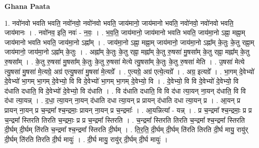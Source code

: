 \documentclass[17pt]{extarticle}
\begin{document}
\textbf{Ghana Paata } \newline

1. नवो॑नवो भवति भवति॒ नवो॑नवो॒ नवो॑नवो भवति॒ जाय॑मानो॒ जाय॑मानो भवति॒ नवो॑नवो॒ नवो॑नवो भवति॒ जाय॑मानः । . नवो॑नव॒ इति॒ नवः॑ - न॒वः॒ । . भ॒व॒ति॒ जाय॑मानो॒ जाय॑मानो भवति भवति॒ जाय॑मा॒नो ऽह्ना॒ मह्ना॒म् जाय॑मानो भवति भवति॒ जाय॑मा॒नो ऽह्ना᳚म् । . जाय॑मा॒नो ऽह्ना॒ मह्ना॒म् जाय॑मानो॒ जाय॑मा॒नो ऽह्ना᳚म् के॒तुः के॒तु रह्ना॒म् जाय॑मानो॒ जाय॑मा॒नो ऽह्ना᳚म् के॒तुः । . अह्ना᳚म् के॒तुः के॒तु रह्ना॒ मह्ना᳚म् के॒तु रु॒षसा॑ मु॒षसा᳚म् के॒तु रह्ना॒ मह्ना᳚म् के॒तु रु॒षसा᳚म् । . के॒तु रु॒षसा॑ मु॒षसा᳚म् के॒तुः के॒तु रु॒षसा॑ मेत्ये त्यु॒षसा᳚म् के॒तुः के॒तु रु॒षसा॑ मेति । . उ॒षसा॑ मेत्ये त्यु॒षसा॑ मु॒षसा॑ मे॒त्यग्रे॒ अग्र॑ एत्यु॒षसा॑ मु॒षसा॑ मे॒त्यग्रे᳚ । . ए॒त्यग्रे॒ अग्र॑ एत्ये॒त्यग्रे᳚ । . अग्र॒ इत्यग्रे᳚ । . भा॒गम् दे॒वेभ्यो॑ दे॒वेभ्यो॑ भा॒गम् भा॒गम् दे॒वेभ्यो॒ वि वि दे॒वेभ्यो॑ भा॒गम् भा॒गम् दे॒वेभ्यो॒ वि । . दे॒वेभ्यो॒ वि वि दे॒वेभ्यो॑ दे॒वेभ्यो॒ वि द॑धाति दधाति॒ वि दे॒वेभ्यो॑ दे॒वेभ्यो॒ वि द॑धाति । . वि द॑धाति दधाति॒ वि वि द॑धा त्या॒यन् ना॒यन् द॑धाति॒ वि वि द॑धा त्या॒यन्न् । . द॒धा॒ त्या॒यन् ना॒यन् द॑धाति दधा त्या॒यन् प्र प्रायन् द॑धाति दधा त्या॒यन् प्र । . आ॒यन् प्र प्रायन् ना॒यन् प्र च॒न्द्रमा᳚ श्च॒न्द्रमाः॒ प्रायन् ना॒यन् प्र च॒न्द्रमाः᳚ । . आ॒यन्नित्या᳚ - यन्न् । . प्र च॒न्द्रमा᳚ श्च॒न्द्रमाः॒ प्र प्र च॒न्द्रमा᳚ स्तिरति तिरति च॒न्द्रमाः॒ प्र प्र च॒न्द्रमा᳚ स्तिरति । . च॒न्द्रमा᳚ स्तिरति तिरति च॒न्द्रमा᳚ श्च॒न्द्रमा᳚ स्तिरति दी॒र्घम् दी॒र्घम् ति॑रति च॒न्द्रमा᳚ श्च॒न्द्रमा᳚ स्तिरति दी॒र्घम् । . ति॒र॒ति॒ दी॒र्घम् दी॒र्घम् ति॑रति तिरति दी॒र्घ मायु॒ रायु॑र् दी॒र्घम् ति॑रति तिरति दी॒र्घ मायुः॑ । . दी॒र्घ मायु॒ रायु॑र् दी॒र्घम् दी॒र्घ मायुः॑ । \newline
\end{document}
